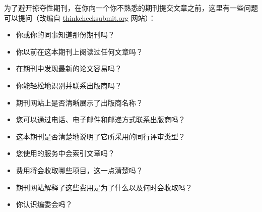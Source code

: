 为了避开掠夺性期刊，在你向一个你不熟悉的期刊提交文章之前，这里有一些问题可以提问（改编自 \href{http://thinkchecksubmit.org}{thinkchecksubmit.org} 网站）：

\begin{itemize}
\item 你或你的同事知道那份期刊吗？
\item 你以前在这本期刊上阅读过任何文章吗？
\item 在期刊中发现最新的论文容易吗？
\item 你能轻松地识别并联系出版商吗？
\item 期刊网站上是否清晰展示了出版商名称？
\item 您可以通过电话、电子邮件和邮递方式联系出版商吗？
\item 这本期刊是否清楚地说明了它所采用的同行评审类型？
\item 您使用的服务中会索引文章吗？
\item 费用将会收取哪些项目，这一点清楚吗？
\item 期刊网站解释了这些费用是为了什么以及何时会收取吗？
\item 你认识编委会吗？

\end{itemize}
